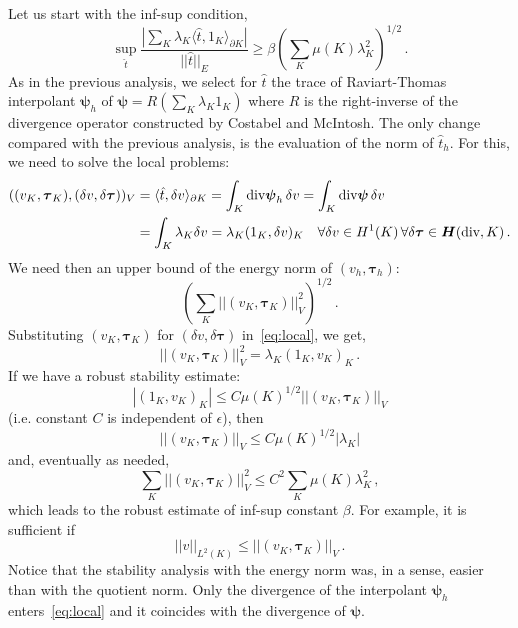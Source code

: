 \documentclass[letterpaper]{article}
\def\bftau{\boldsymbol\tau}
\newcommand{\LRp}[1]{\left( #1 \right)}
\newcommand{\ptl}{{\partial}}
\newcommand{\bfpsi}{\boldsymbol\psi}
\newcommand{\bfH}{\mbox{\boldmath $H$}}
\begin{document}
Let us start with the inf-sup condition,
\begin{equation}
\sup_{\hat{t}} \frac{| \sum_K \lambda_K \langle \hat{t},1_K \rangle_{\partial K} |}{|| \hat{t} ||_E}
\geq  \beta \LRp{\sum_K \mu(K) \lambda_K^2}^{1/2}\,.
\end{equation}
As in the previous analysis, we select for $\hat{t}$ the trace of Raviart-Thomas
interpolant $\bfpsi_h$ of $\bfpsi = R (\sum_K \lambda_K 1_K)$ where $R$ is the right-inverse
of the divergence operator constructed by Costabel and McIntosh. The only change compared
with the previous analysis, is the evaluation of the norm of $\hat{t}_h$. For this, we need
to solve the local problems:
\begin{align}
((v_K,\bftau_K), (\delta v, \delta \bftau))_V &= \langle \hat{t}, \delta v \rangle_{\ptl K}
= \int_K \text{div} \bfpsi_h \, \delta v = \int_K \text{div} \bfpsi \, \delta v
\nonumber\\
&= \int_K \lambda_K \delta v
= \lambda_K (1_K,\delta v)_K  \quad \forall \delta v \in
H^1(K)\,\forall\delta\bftau\in\bfH(\text{div},K)\,.
\label{eq:local}
\end{align}
We need then an upper bound of the energy norm of $(v_h,\bftau_h)$:
$$
\LRp{\sum_K || (v_K,\bftau_K) ||_V^2}^{1/2}\,.
$$
Substituting $(v_K,\bftau_K)$ for $(\delta v,\delta\bftau)$ in~\eqref{eq:local}, we get,
\begin{equation}
|| (v_K,\bftau_K) ||_V^2 = \lambda_K (1_K, v_K)_K\,.
\end{equation}
If we have a robust stability estimate:
\begin{equation}
|(1_K, v_K)_K| \leq C \mu(K)^{1/2} || (v_K,\bftau_K) ||_V
\label{eq:robustEst1}
\end{equation}
(i.e. constant $C$ is independent of $\epsilon$), then
\begin{equation}
||  (v_K,\bftau_K) ||_V \leq C \mu(K)^{1/2} | \lambda_K |
\end{equation}
and, eventually as needed,
\begin{equation}
\sum_K || (v_K,\bftau_K) ||_V^2  \leq C^2 \sum_K \mu(K) \lambda_K^2\,,
\end{equation}
which leads to the robust estimate of inf-sup constant $\beta$. For example, it is sufficient if
\begin{equation}
|| v ||_{L^2(K)} \leq || (v_K,\bftau_K) ||_V \, .
\label{eq:robust_est1}
\end{equation}
Notice that the stability analysis with the energy norm was, in a sense, easier than
with the quotient norm. Only the divergence of the interpolant $\bfpsi_h$
enters~\eqref{eq:local}
and it coincides with the divergence of $\bfpsi$.
\end{document}
